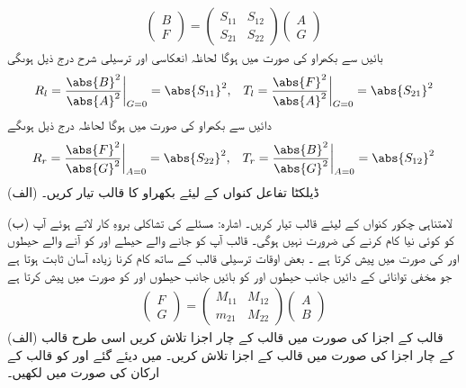 \begin{align}
	\begin{pmatrix}
		B\\
		F
	\end{pmatrix}
	=
	\begin{pmatrix}
		S_{11} & S_{12}\\
		S_{21} & S_{22}
	\end{pmatrix}
	\begin{pmatrix}
		A\\
		G
	\end{pmatrix}
\end{align}
بائیں سے بکھراو کی صورت میں  ہوگا لحاظہ انعکاسی اور ترسیلی شرح درج ذیل ہوںگی
\begin{align}
	R_l=\frac{\abs{B}^2}{\abs{A}^2}\bigg|_{G=0}=\abs{S_{11}}^2,&& T_l=\frac{\abs{F}^2}{\abs{A}^2}\bigg|_{G=0}=\abs{S_{21}}^2
\end{align}
دائیں سے بکھراو کی صورت میں  ہوگا لحاظہ درج ذیل ہوںگے
\begin{align}
	R_r=\frac{\abs{F}^2}{\abs{G}^2}\bigg|_{A=0}=\abs{S_{22}}^2,&& T_r=\frac{\abs{B}^2}{\abs{G}^2}\bigg|_{A=0}=\abs{S_{12}}^2
\end{align}
(الف) ڈیلکٹا تفاعل کنواں  کے لیئے بکھراو کا  قالب تیار کریں۔

(ب) لامتناہی چکور کنواں  کے لیئے  قالب تیار کریں۔ اشارہ: مسئلے کی تشاکلی بروہِ کار لاتے ہوئے آپ کو کوئی نیا کام کرنے کی ضرورت نہیں ہوگی۔ 
 قالب   آپ کو جانے والے حیطے  اور  کو آنے والے حیطوں  اور  کی صورت میں پیش کرتا ہے ۔ بعض اوقات ترسیلی قالب  کے ساتھ کام کرنا زیادہ آسان ثابت ہوتا ہے جو مخفی توانائی کے دائیں جانب حیطوں  اور  کو بائیں جانب حیطوں  اور  کو صورت میں پیش کرتا ہے
\begin{align}
	\begin{pmatrix}
		F\\
		G
	\end{pmatrix}
	=
	\begin{pmatrix}
		M_{11} & M_{12} \\
		m_{21} & M_{22}
	\end{pmatrix}
	\begin{pmatrix}
		A\\
		B
	\end{pmatrix}
\end{align}
(الف) قالب  کے اجزا کی صورت میں قالب  کے چار اجزا تلاش کریں اسی طرح قالب  کے چار اجزا کی صورت میں قالب  کے اجزا تلاش کریں۔  میں دیئے گئے  اور  کو  قالب کے ارکان کی صورت میں لکھیں۔

